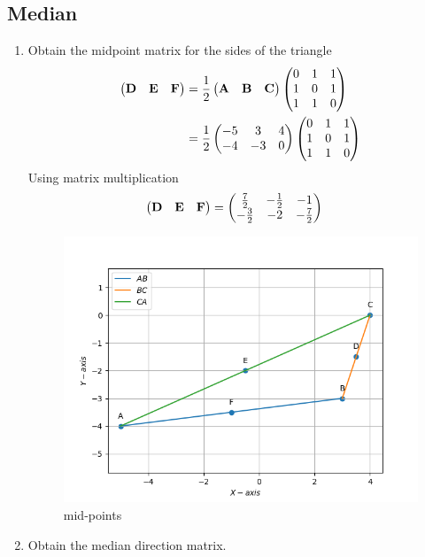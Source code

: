 \documentclass[10pt]{book}
\begin{document}
\subsection{Median}
\begin{enumerate}[label=\thesubsection.\arabic*.,ref=\thesubsection.\theenumi]
\item Obtain the midpoint matrix for the sides of the triangle \\
\solution
\begin{align}
\begin{pmatrix}\mathbf{D} & \mathbf{E} &\mathbf{F}\end{pmatrix} &= \frac{1}{2}\begin{pmatrix}\mathbf{A} & \mathbf{B} &\mathbf{C}\end{pmatrix}
\begin{pmatrix}0 & 1 & 1 \\ 1 & 0 & 1 \\ 1 & 1 & 0\end{pmatrix} \\
&= \frac{1}{2}\begin{pmatrix}-5 & 3 & 4 \\ -4 & -3 & 0\end{pmatrix}\begin{pmatrix}0 & 1 & 1 \\ 1 & 0 & 1 \\ 1 & 1 & 0\end{pmatrix}
\end{align}
Using matrix multiplication 
\begin{align}
    \begin{pmatrix}\mathbf{D} & \mathbf{E} &\mathbf{F}\end{pmatrix} &= \begin{pmatrix}\frac{7}{2} & -\frac{1}{2} & -1 \\ -\frac{3}{2} & -2 & -\frac{7}{2}\end{pmatrix}
\end{align}
\begin{figure}[H]
    \centering
   \includegraphics{figs/DEF_midpoints.png}
    \caption{mid-points}
    \label{fig:DEF_midpoints}
\end{figure}
\item Obtain the median direction matrix. \\

\end{enumerate}
\end{document}
